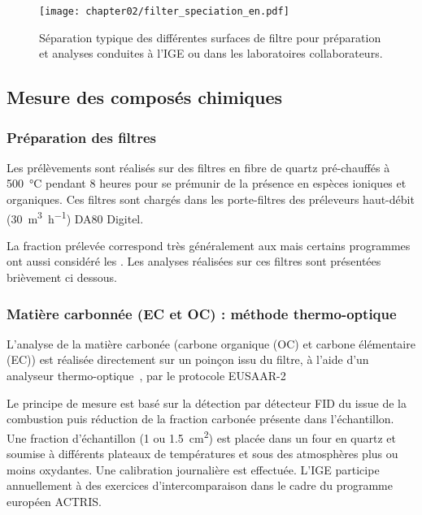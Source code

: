 \begin{figure}[ht]
    \centering
    \texttt{[image: chapter02/filter\_speciation\_en.pdf]}
    \caption{Séparation typique des différentes surfaces de filtre pour préparation et
    analyses conduites à l'IGE ou dans les laboratoires collaborateurs.}%
    \label{fig:chapter02/filter_speciation_en}
\end{figure}

\subsection{Mesure des composés chimiques}%
\label{sub:analyses_des_composés}

\subsubsection{Préparation des filtres}%
\label{sub:préparation_des_filtres}

Les prélèvements sont réalisés sur des filtres en fibre de quartz pré-chauffés à
\SI{500}{\degreeCelsius} pendant 8 heures pour se prémunir de la présence en espèces
ioniques et organiques. Ces filtres sont chargés dans les porte-filtres des préleveurs
haut-débit (\SI{30}{\cubic\m\per\hour}) DA80 Digitel.

La fraction prélevée correspond très généralement aux \PMdix{} mais certains programmes
ont aussi considéré les \PMdc.
Les analyses réalisées sur ces filtres sont présentées brièvement ci dessous.

\subsubsection{Matière carbonnée (EC et OC) : méthode thermo-optique}%
\label{ssub:matière_carbonnée_ec_et_oc_}

L’analyse de la matière carbonée (carbone organique (OC) et carbone élémentaire (EC)) est
réalisée directement sur un poinçon issu du filtre, à l’aide d’un analyseur
thermo-optique~\autocite[Sunset Lab. Analyser]{birchElemental1996}, par le protocole
EUSAAR-2~\autocite{cavalliStandardised2010,cenAmbient2017a}

Le principe de mesure est basé sur la détection par détecteur FID du  issue de la
combustion puis réduction de la fraction carbonée présente dans l’échantillon. Une
fraction d'échantillon (1 ou \SI{1.5}{\centi\m\squared}) est placée dans un four en quartz
et soumise à différents plateaux de températures et sous des atmosphères plus ou moins
oxydantes. Une calibration journalière est effectuée. L’IGE participe annuellement à des
exercices d’intercomparaison dans le cadre du programme européen ACTRIS.

